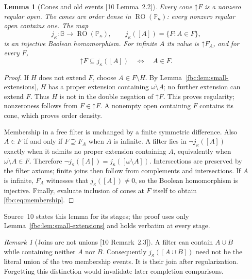\documentclass[11pt,letterpaper]{article}
\newtheorem{lemma}[theorem]{Lemma}
\theoremstyle{definition}
\theoremstyle{remark}
\newtheorem{remark}[theorem]{Remark}
\newcommand{\om}{\omega}
\newcommand{\B}{\mathbb B}
\newcommand{\PP}{\mathbb P}
\newcommand{\up}{\mathord{\uparrow}}
\newcommand{\RO}{\operatorname{RO}}
\newcommand{\src}[1]{\textup{[#1]}}
\begin{document}
\begin{lemma}[Cones and old events \src{10 Lemma~2.2}]
\label{fbc:lem:cones}
Every cone $\up F$ is a nonzero regular open. The cones are order
dense in $\RO(\PP_\kappa)$: every nonzero regular open contains one. The
map
\begin{equation}\label{fbc:eq:j}
 j_\kappa:\B\longrightarrow\RO(\PP_\kappa),
 \qquad j_\kappa([A])=\{F:A\in F\},
\end{equation}
is an injective Boolean homomorphism. For infinite $A$ its value is
$\up F_A$, and for every $F$,
\begin{equation}\label{fbc:eq:membership}
 \up F\subseteq j_\kappa([A])\quad\Longleftrightarrow\quad A\in F.
\end{equation}
\end{lemma}
\begin{proof}
If $H$ does not extend $F$, choose $A\in F\setminus H$. By
Lemma~\ref{fbc:lem:small-extensions}, $H$ has a proper extension
containing $\om\setminus A$; no further extension can extend $F$. Thus
$H$ is not in the double negation of $\up F$. This proves regularity;
nonzeroness follows from $F\in\up F$. A nonempty open containing $F$
contains its cone, which proves order density.

Membership in a free filter is unchanged by a finite symmetric
difference. Also $A\in F$ if and only if $F\supseteq F_A$ when $A$ is
infinite. A filter lies in $\neg j_\kappa([A])$ exactly when it admits no
proper extension containing $A$, equivalently when $\om\setminus A\in F$.
Therefore $\neg j_\kappa([A])=j_\kappa([\om\setminus A])$. Intersections
are preserved by the filter axioms; finite joins then follow from
complements and intersections. If $A$ is infinite, $F_A$ witnesses that
$j_\kappa([A])\ne0$, so the Boolean homomorphism is injective. Finally,
evaluate inclusion of cones at $F$ itself to obtain
\eqref{fbc:eq:membership}.
\end{proof}

Source~10 states this lemma for its stages; the proof uses only
Lemma~\ref{fbc:lem:small-extensions} and holds verbatim at every stage.

\begin{remark}[Joins are not unions \src{10 Remark~2.3}]\label{fbc:rem:joins}
A filter can contain $A\cup B$ while containing neither $A$ nor $B$.
Consequently $j_\kappa([A\cup B])$ need not be the literal union of the
two membership events. It is their join after regularization. Forgetting
this distinction would invalidate later completion comparisons.
\end{remark}
\end{document}
